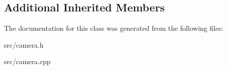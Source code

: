 \subsection*{Additional Inherited Members}


The documentation for this class was generated from the following files\+:\begin{DoxyCompactItemize}
\item 
src/camera.\+h\item 
src/camera.\+cpp\end{DoxyCompactItemize}
